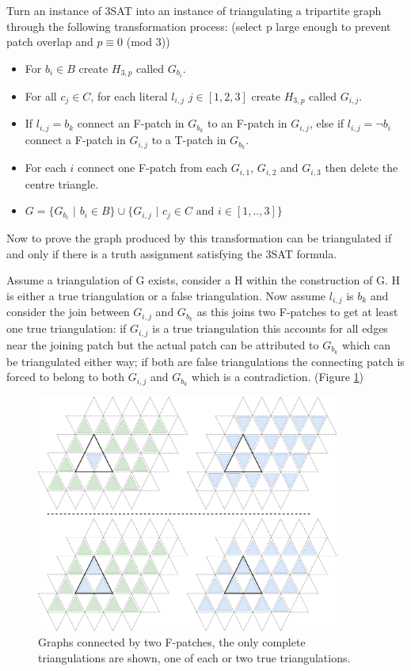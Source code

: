\documentclass[a4paper,11pt]{report}
\begin{document}
Turn an instance of 3SAT into an instance of triangulating a tripartite graph through the following transformation process: (select p large enough to prevent patch overlap and $p\equiv 0 $ (mod 3))
\begin{itemize}
\item For $b_i\in B$ create $H_{3,p}$ called $G_{b_i}$.
\item For all $c_j\in C$, for each literal $l_{i,j}$ $j\in [1,2,3]$ create $H_{3,p}$ called $G_{i,j}$.
\item If $l_{i,j}=b_k$ connect an F-patch in $G_{b_k}$ to an F-patch in $G_{i,j}$, else if $l_{i,j}=\neg b_i$ connect a F-patch in $G_{i,j}$ to a T-patch in $G_{b_k}$.
\item For each $i$ connect one F-patch from each $G_{i,1}$, $G_{i,2}$ and $G_{i,3}$ then delete the centre triangle. 
\item $G = \{G_{b_i}$ $|$ $b_i \in B\}\cup\{G_{i,j}$ $|$ $ c_j\in C\text{ and }i\in [1,..,3] \}$
\end{itemize}
Now to prove the graph produced by this transformation can be triangulated if and only if there is a truth assignment satisfying the 3SAT formula.

Assume a triangulation of G exists, consider a H within the construction of G. H is either a true triangulation or a false triangulation. Now assume $l_{i,j}$ is $b_k$ and consider the join between $G_{i,j}$ and $G_{b_k}$ as this joins two F-patches to get at least one true triangulation: if $G_{i,j}$ is a true triangulation this accounts for all edges near the joining patch but the actual patch can be attributed to $G_{b_k}$ which can be triangulated either way; if both are false triangulations the connecting patch is forced to belong to both $G_{i,j}$ and $G_{b_k}$ which is a contradiction. (Figure \ref{holyerone})

\begin{figure}[h!]
\begin{center}
\includegraphics[width=100mm]{figures/first_holyer_lemma.png}
\end{center}
\caption{Graphs connected by two F-patches, the only complete triangulations are shown, one of each or two true triangulations.}
\label{holyerone}
\end{figure}
\end{document}
